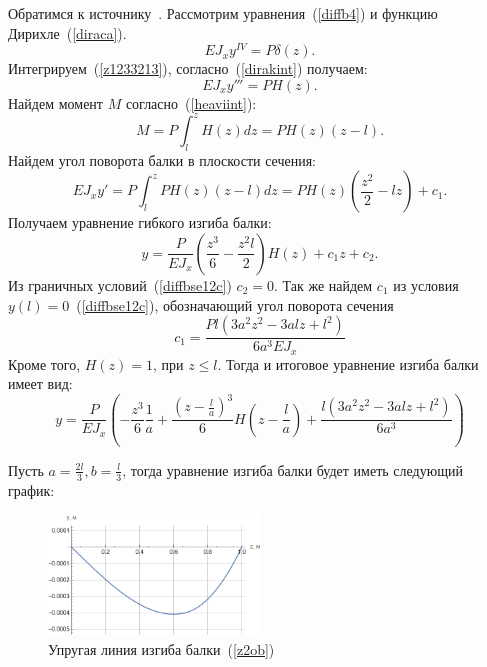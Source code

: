 \documentclass[12pt, a4paper]{article}
\begin{document}
Обратимся к источнику~\cite{Birger}.
Рассмотрим уравнения~(\ref{diffb4}) и функцию Дирихле~(\ref{diraca}). 
\begin{equation}
	\label{z1233213}
	E J_{x} y^{IV} = P \delta (z).
\end{equation}
Интегрируем~(\ref{z1233213}), согласно~(\ref{dirakint}) получаем:
\begin{equation}
	\label{z12213}
	E J_{x} y''' = P H (z).
\end{equation}
Найдем момент $M$ согласно~(\ref{heaviint}):
\begin{equation}
	\label{z121334}
	M = P \int_l^z  H (z) dz = P H (z) (z - l).
\end{equation}
Найдем угол поворота балки в плоскости сечения:
\begin{equation}
	\label{z1213}
	E J_{x} y' = P \int_l^z P H (z) (z - l) dz = P H(z)(\frac{z^2}{2} - l z) + c_1.
\end{equation}
Получаем уравнение гибкого изгиба балки:
\begin{equation}
	\label{z123213}
	y = \frac{P}{E J_{x}} (\frac{z^3}{6} - \frac{z^2 l}{2}) H(z) + c_1 z + c_2.
\end{equation}
Из граничных условий~(\ref{diffbse12c}) $c_2 = 0$. Так же найдем $c_1$ из условия $y(l) = 0$~(\ref{diffbse12c}), обозначающий угол поворота сечения
\begin{equation}
	\label{z12321233}
	c_1 = \frac{P l(3 a^2 z^2 - 3 a l z + l^2)}{6 a^3 E J_{x}}
\end{equation}
Кроме того, $H(z) = 1 \mbox{, при } z \leqslant l$. 
Тогда и  итоговое уравнение изгиба балки имеет вид:
\begin{equation}
	\label{z2ob}
	y = \frac{P}{E J_{x}} (-\frac{z^3}{6} \frac{1}{a} + \frac{(z - \frac{l}{a})^3}{6} H(z - \frac{l}{a}) + \frac{l(3 a^2 z^2 - 3 a l z + l^2)}{6 a^3})
\end{equation}

Пусть $a = \frac{2 l}{3}, b = \frac{l}{3}$, тогда уравнение изгиба балки будет иметь следующий график:
\begin{figure}[!h]
	\centering
	\includegraphics[width=0.5\textwidth]{g.4}%
	\caption{Упругая линия изгиба балки~(\ref{z2ob})}
	\vspace*{-2mm}
	\label{g4}
\end{figure}
\end{document}
